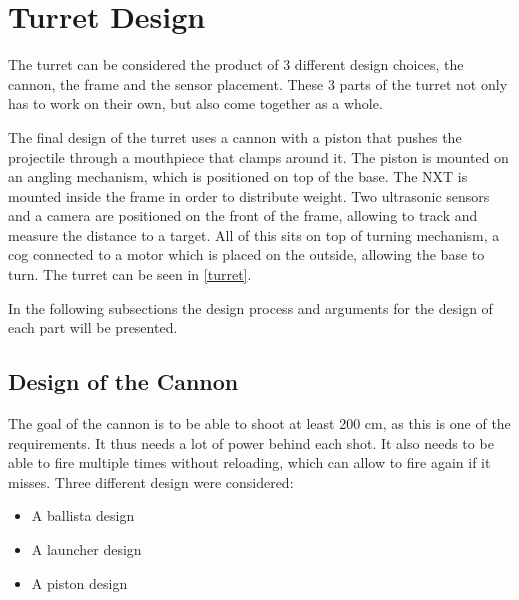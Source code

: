 \section{Turret Design}
The turret can be considered the product of 3 different design choices, the
cannon, the frame and the sensor placement. These 3 parts of the
turret not only has to work on their own, but also come together as a whole.\nl

The final design of the turret uses a cannon with a piston
that pushes the projectile through a mouthpiece that clamps around it. The
piston is mounted on an angling mechanism, which is positioned on top of
the base. The NXT is mounted inside the frame in order to distribute weight. Two
ultrasonic sensors and a camera are positioned on the front of the frame,
allowing \name to track and measure the distance to a target. All of this sits
on top of turning mechanism, a cog connected to a motor which is placed on the
outside, allowing the base to turn. The turret can be seen in \autoref{turret}. 


In the following subsections the design process and arguments for the
design of each part will be presented.

\subsection{Design of the Cannon}
The goal of the cannon is to be able to shoot at least
200 cm, as this is one of the requirements. It thus needs a lot of power behind
each shot. It also needs to be able to fire multiple times without reloading,
which can allow to fire again if it misses. Three different design were
considered:

\begin{itemize}
  \item A ballista design
  \item A launcher design
  \item A piston design
\end{itemize}

\begin{figure}[H]
\begin{minipage}{.31\textwidth}
\end{minipage}
\begin{minipage}{.29\linewidth}
\end{minipage}
\begin{minipage}{.29\linewidth}
\end{minipage}
\end{figure}

